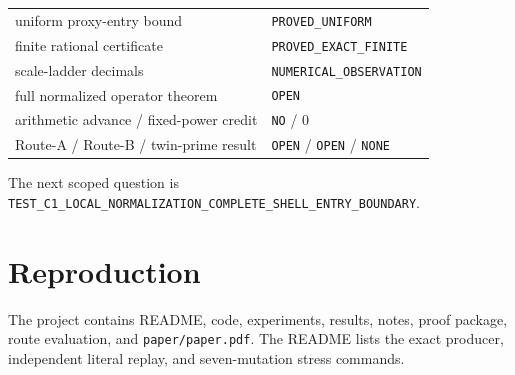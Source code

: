 \documentclass[11pt]{article}
\begin{document}
\begin{center}
\begin{tabular}{@{}ll@{}}
\toprule
uniform proxy-entry bound & \texttt{PROVED\_UNIFORM}\\
finite rational certificate & \texttt{PROVED\_EXACT\_FINITE}\\
scale-ladder decimals & \texttt{NUMERICAL\_OBSERVATION}\\
full normalized operator theorem & \texttt{OPEN}\\
arithmetic advance / fixed-power credit & \texttt{NO} / 0\\
Route-A / Route-B / twin-prime result & \texttt{OPEN} / \texttt{OPEN} / \texttt{NONE}\\
\bottomrule
\end{tabular}
\end{center}

The next scoped question is
\texttt{TEST\_C1\_LOCAL\_NORMALIZATION\_COMPLETE\_SHELL\_ENTRY\_BOUNDARY}.

\section*{Reproduction}
The project contains README, code, experiments, results, notes, proof
package, route evaluation, and \texttt{paper/paper.pdf}.  The README lists
the exact producer, independent literal replay, and seven-mutation stress
commands.
\end{document}
